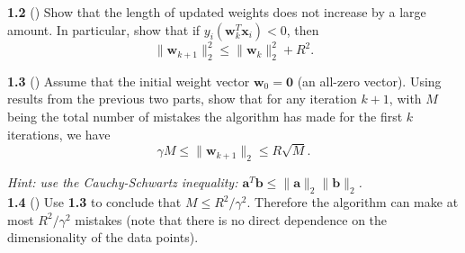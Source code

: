 \textbf{1.2} () Show that the length of updated weights does not increase by a large amount. In particular, show that if $y_i(\mathbf{w}_{k}^T\mathbf{x}_i) < 0$, then
\begin{equation}
    \|\mathbf{w}_{k+1}\|_2^2 \leq \|\mathbf{w}_k\|_2^2+R^2.
\end{equation}


\textbf{1.3} () Assume that the initial weight vector $\mathbf{w}_{0}=\mathbf{0}$ (an all-zero vector). Using results from the previous two parts, show that for any iteration $k+1$, with $M$ being the total number of mistakes the algorithm has made for the first $k$ iterations, we have
\begin{equation}
    \gamma M \leq \|\mathbf{w}_{k+1}\|_2 \leq R\sqrt{M}.
\end{equation}

\emph{Hint: use the Cauchy-Schwartz inequality: $\mathbf{a}^T\mathbf{b}\leq \|\mathbf{a}\|_2 \|\mathbf{b}\|_2$.}\\


\textbf{1.4} () Use \textbf{1.3} to conclude that $M \leq {R^2}/{\gamma^2}$. Therefore the algorithm can make at most ${R^2}/{\gamma^2}$ mistakes (note that there is no direct dependence on the dimensionality of the data points).
